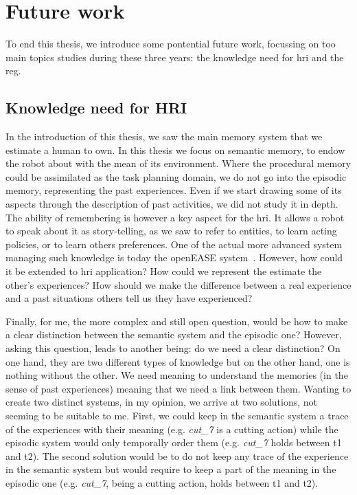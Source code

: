 \section*{Future work}

To end this thesis, we introduce some pontential future work, focussing on too main topics studies during these three years: the knowledge need for \acrshort{hri} and the \acrshort{reg}.

\subsection*{Knowledge need for HRI}

In the introduction of this thesis, we saw the main memory system that we estimate a human to own. In this thesis we focus on semantic memory, to endow the robot about with the mean of its environment. Where the procedural memory could be assimilated as the task planning domain, we do not go into the episodic memory, representing the past experiences. Even if we start drawing some of its aspects through the description of past activities, we did not study it in depth. The ability of remembering is however a key aspect for the \acrshort{hri}. It allows a robot to speak about it as story-telling, as we saw to refer to entities, to learn acting policies, or to learn others preferences. One of the actual more advanced system managing such knowledge is today the openEASE system~\cite{beetz_2015_open}. However, how could it be extended to \acrshort{hri} application? How could we represent the estimate the other's experiences? How should we make the difference between a real experience and a past situations others tell us they have experienced?

Finally, for me, the more complex and still open question, would be how to make a clear distinction between the semantic system and the episodic one? However, asking this question, leads to another being: do we need a clear distinction? On one hand, they are two different types of knowledge but on the other hand, one is nothing without the other. We need meaning to understand the memories (in the sense of past experiences) meaning that we need a link between them. Wanting to create two distinct systems, in my opinion, we arrive at two solutions, not seeming to be suitable to me. First, we could keep in the semantic system a trace of the experiences with their meaning (e.g. \textit{cut\_7} is a cutting action) while the episodic system would only temporally order them (e.g. \textit{cut\_7} holds between t1 and t2). The second solution would be to do not keep any trace of the experience in the semantic system but would require to keep a part of the meaning in the episodic one (e.g. \textit{cut\_7}, being a cutting action, holds between t1 and t2).

